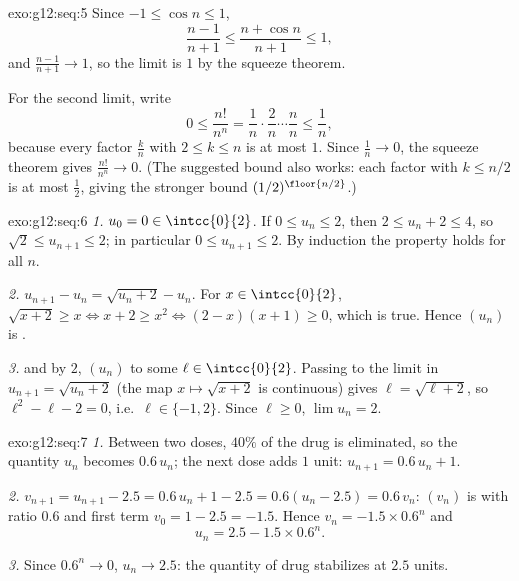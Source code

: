 \begin{solution}{exo:g12:seq:5}
Since $-1 \leq \cos n \leq 1$,
\[
\frac{n-1}{n+1} \leq \frac{n + \cos n}{n+1} \leq 1,
\]
and $\frac{n-1}{n+1} \to 1$, so the limit is $1$ by the squeeze theorem.

For the second limit, write
\[
0 \leq \frac{n!}{n^n}
= \frac{1}{n}\cdot\frac{2}{n}\cdots\frac{n}{n}
\leq \frac{1}{n},
\]
because every factor $\frac{k}{n}$ with $2 \leq k \leq n$ is at most $1$.
Since $\frac1n \to 0$, the squeeze theorem gives $\frac{n!}{n^n} \to 0$. (The
suggested  bound also works: each factor with $k \leq n/2$ is at most
$\frac12$, giving the stronger bound $(1/2)^{\floor{n/2}}$.)
\end{solution}

\begin{solution}{exo:g12:seq:6}
\emph{1.} $u_0 = 0 \in \intcc{0}{2}$. If $0 \leq u_n \leq 2$, then
$2 \leq u_n + 2 \leq 4$, so $\sqrt{2} \leq u_{n+1} \leq 2$; in particular
$0 \leq u_{n+1} \leq 2$. By induction the property holds for all $n$.

\emph{2.} $u_{n+1} - u_n = \sqrt{u_n + 2} - u_n$. For $x \in \intcc{0}{2}$,
$\sqrt{x+2} \geq x \iff x + 2 \geq x^2 \iff (2-x)(x+1) \geq 0$, which is true.
Hence $(u_n)$ is .

\emph{3.}  and  by $2$, $(u_n)$  to some
$\ell \in \intcc{0}{2}$. Passing to the limit in $u_{n+1} = \sqrt{u_n + 2}$
(the map $x \mapsto \sqrt{x+2}$ is continuous) gives $\ell = \sqrt{\ell + 2}$,
so $\ell^2 - \ell - 2 = 0$, i.e.\ $\ell \in \{-1, 2\}$. Since $\ell \geq 0$,
$\lim u_n = 2$.
\end{solution}

\begin{solution}{exo:g12:seq:7}
\emph{1.} Between two doses, $40\%$ of the drug is eliminated, so the
quantity $u_n$ becomes $0.6\,u_n$; the next dose adds $1$ unit:
$u_{n+1} = 0.6\,u_n + 1$.

\emph{2.} $v_{n+1} = u_{n+1} - 2.5 = 0.6\,u_n + 1 - 2.5 = 0.6(u_n - 2.5)
= 0.6\,v_n$: $(v_n)$ is  with ratio $0.6$ and first term
$v_0 = 1 - 2.5 = -1.5$. Hence $v_n = -1.5 \times 0.6^n$ and
\[
u_n = 2.5 - 1.5 \times 0.6^n .
\]

\emph{3.} Since $0.6^n \to 0$, $u_n \to 2.5$: the quantity of drug stabilizes
at $2.5$ units.
\end{solution}

